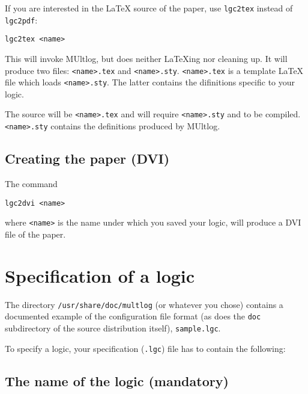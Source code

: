 \documentclass[
]{article}
\newcommand{\passthrough}[1]{#1}
\begin{document}
If you are interested in the LaTeX source of the paper, use
\passthrough{\lstinline!lgc2tex!} instead of
\passthrough{\lstinline!lgc2pdf!}:

\begin{lstlisting}
lgc2tex <name>
\end{lstlisting}

This will invoke MUltlog, but does neither LaTeXing nor cleaning up. It
will produce two files: \passthrough{\lstinline!<name>.tex!} and
\passthrough{\lstinline!<name>.sty!}.
\passthrough{\lstinline!<name>.tex!} is a template LaTeX file which
loads \passthrough{\lstinline!<name>.sty!}. The latter contains the
difinitions specific to your logic.

The source will be \passthrough{\lstinline!<name>.tex!} and will require
\passthrough{\lstinline!<name>.sty!} and to be compiled.
\passthrough{\lstinline!<name>.sty!} contains the definitions produced
by MUltlog.

\hypertarget{creating-the-paper-dvi}{%
\subsection{Creating the paper (DVI)}\label{creating-the-paper-dvi}}

The command

\begin{lstlisting}
lgc2dvi <name>
\end{lstlisting}

where \passthrough{\lstinline!<name>!} is the name under which you saved
your logic, will produce a DVI file of the paper.

\hypertarget{specification-of-a-logic}{%
\section{Specification of a logic}\label{specification-of-a-logic}}

The directory \passthrough{\lstinline!/usr/share/doc/multlog!} (or
whatever you chose) contains a documented example of the configuration
file format (as does the \passthrough{\lstinline!doc!} subdirectory of
the source distribution itself), \passthrough{\lstinline!sample.lgc!}.

To specify a logic, your specification (\passthrough{\lstinline!.lgc!})
file has to contain the following:

\hypertarget{the-name-of-the-logic-mandatory}{%
\subsection{The name of the logic
(mandatory)}\label{the-name-of-the-logic-mandatory}}
\end{document}
